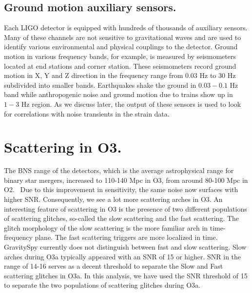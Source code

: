 \documentclass[12pt]{iopart}
\begin{document}
\subsection{Ground motion auxiliary sensors.}
Each LIGO detector is equipped with hundreds of thousands of auxiliary sensors. Many of these channels are not sensitive to gravitational waves and are used to identify various environmental and physical couplings to the detector.
Ground motion in various frequency bands, for example, is measured by seismometers located at end stations and corner station. These seismometers record ground motion in X, Y and Z direction in the frequency range from 0.03 Hz to 30 Hz subdivided into smaller bands. Earthquakes shake the ground in $0.03-0.1$ Hz band while anthropogenic noise and ground motion due to trains show up in $1-3$ Hz region. As we discuss later, the output of these sensors is used to look for correlations with noise transients in the strain data.
\quad


\section{Scattering in O3.}\label{scatino3}
The BNS range of the detectors, which is the average astrophysical range for binary star mergers, increased to 110-140 Mpc in O3, from around 80-100 Mpc in O2.~\cite{prospect} Due to this improvement in sensitivity, the same noise now surfaces with higher SNR.
Consequently, we see a lot more scattering arches in O3. An interesting feature of scattering in O3 is the presence of two different populations of scattering glitches, so-called the slow scattering and the fast scattering. The glitch morphology of the slow scattering is the more familiar arch in time-frequency plane. The fast scattering triggers are more localized in time. GravitySpy currently does not distinguish between fast and slow scattering. Slow arches during O3a  typically appeared with an SNR of 15 or higher. SNR in the range of 14-16 serves as a decent threshold to separate the Slow and Fast scattering glitches in O3a. In this analysis, we have used the SNR threshold of 15 to separate the two populations of scattering glitches during O3a.
\end{document}
